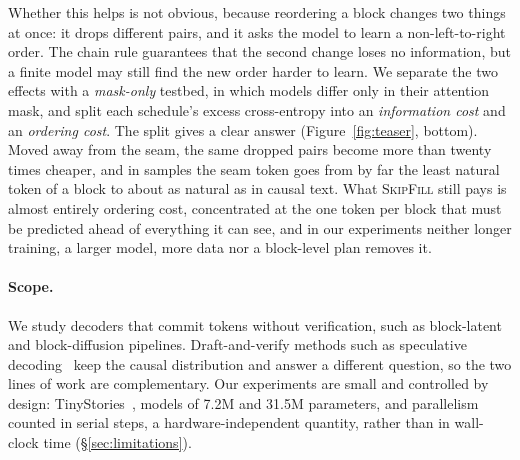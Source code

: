 \documentclass{article}
\theoremstyle{definition}
\theoremstyle{remark}
\newcommand{\name}[1]{\textup{\textsc{#1}}}
\newcommand{\sfill}{\name{SkipFill}\xspace}
\begin{document}
Whether this helps is not obvious, because reordering a block changes two things at once: it drops different pairs, and it asks the model to learn a non-left-to-right order.
The chain rule guarantees that the second change loses no information, but a finite model may still find the new order harder to learn.
We separate the two effects with a \emph{mask-only} testbed, in which models differ only in their attention mask, and split each schedule's excess cross-entropy into an \emph{information cost} and an \emph{ordering cost}.
The split gives a clear answer (Figure~\ref{fig:teaser}, bottom).
Moved away from the seam, the same dropped pairs become more than twenty times cheaper, and in samples the seam token goes from by far the least natural token of a block to about as natural as in causal text.
What \sfill still pays is almost entirely ordering cost, concentrated at the one token per block that must be predicted ahead of everything it can see, and in our experiments neither longer training, a larger model, more data nor a block-level plan removes it.

\paragraph{Scope.}
We study decoders that commit tokens without verification, such as block-latent and block-diffusion pipelines.
Draft-and-verify methods such as speculative decoding~\citep{leviathan2023speculative,chen2023speculative} keep the causal distribution and answer a different question, so the two lines of work are complementary.
Our experiments are small and controlled by design: TinyStories~\citep{eldan2023tinystories}, models of 7.2M and 31.5M parameters, and parallelism counted in serial steps, a hardware-independent quantity, rather than in wall-clock time (\S\ref{sec:limitations}).
\end{document}
